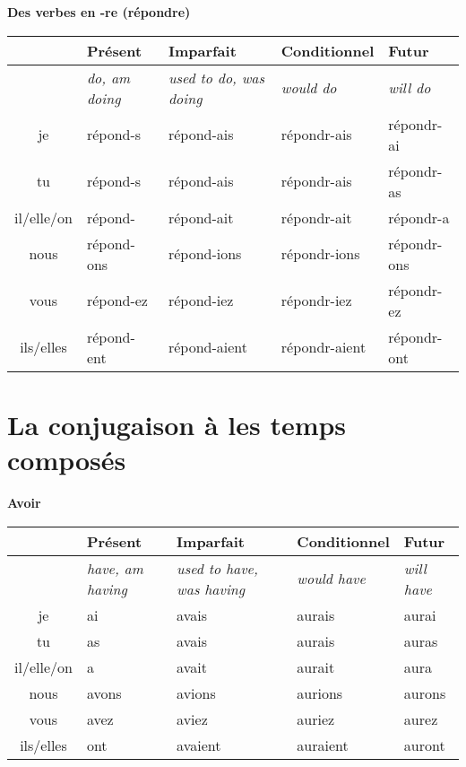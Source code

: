 \vskip 1.5cm
\renewcommand{\stemPresent}{r\'epond}
\renewcommand{\stemFutur}{r\'epondr}
\begin{center}
\textbf{Des verbes en -re (r\'epondre)}
\vskip 0.1cm
\begin{tabular}{|c||L{3cm}|L{3cm}|L{3cm}|L{3cm}|}
\hline
& Pr\'esent & Imparfait & Conditionnel & Futur \\
\hline
& \textit{do, am doing} & \textit{used to do, was doing} & \textit{would do} & \textit{will do} \\
\hline\hline
je           &	\stemPresent-s 	&	\stemPresent-ais	&	\stemFutur-ais	 &	\stemFutur-ai	\\
tu           &	\stemPresent-s	&	\stemPresent-ais	&	\stemFutur-ais	&	\stemFutur-as	\\
il/elle/on &	\stemPresent-	&	\stemPresent-ait	&	\stemFutur-ait	&	\stemFutur-a	\\
nous      &	\stemPresent-ons	&	\stemPresent-ions	&	\stemFutur-ions	&	\stemFutur-ons	\\
vous      &	\stemPresent-ez	&	\stemPresent-iez	&	\stemFutur-iez		&	\stemFutur-ez	\\
ils/elles  &	\stemPresent-ent	&	\stemPresent-aient	&	\stemFutur-aient	&	\stemFutur-ont	\\
\hline
\end{tabular}
\end{center}


\clearpage
\section{La conjugaison \`a les temps compos\'es}
\setcounter{theorem}{0}
\setcounter{equation}{0}

\begin{flushleft}
\textbf{Avoir}
\vskip 0.1cm
\begin{tabular}{|c||L{2.5cm}|L{2.5cm}|L{2.5cm}|L{2.5cm}|}
\hline
& Pr\'esent & Imparfait & Conditionnel & Futur \\
\hline
& \textit{have, am having} & \textit{used to have, was having} & \textit{would have} & \textit{will have} \\
\hline\hline
je            &	ai	&	avais	&	aurais	 &	aurai	\\
tu            &	as 	&	avais	&	aurais	&	auras	\\
il/elle/on  &	a	&	avait	&	aurait	&	aura	\\
nous       &	avons	&	avions	&	aurions	&	aurons	\\
vous       &	avez	&	aviez	&	auriez		&	aurez	\\
ils/elles   &	ont 	&	avaient	&	auraient	&	auront	\\
\hline
\end{tabular}
\end{flushleft}

